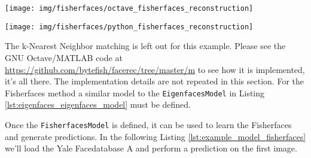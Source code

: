 \ifx\python\undefined
	\begin{center}
		\texttt{[image: img/fisherfaces/octave\_fisherfaces\_reconstruction]}
	\end{center}
\else
	\begin{center}
		\texttt{[image: img/fisherfaces/python\_fisherfaces\_reconstruction]}
	\end{center}
\fi

\ifx\python\undefined
	The k-Nearest Neighbor matching is left out for this example. Please see the GNU Octave/MATLAB code at \url{https://github.com/bytefish/facerec/tree/master/m} to see how it is implemented, it's all there.
\else
	The implementation details are not repeated in this section. For the Fisherfaces method a similar model to the \lstinline|EigenfacesModel| in Listing \ref{lst:eigenfaces_eigenfaces_model} must be defined.
		
	
	
		Once the \lstinline|FisherfacesModel| is defined, it can be used to learn the Fisherfaces and generate predictions. In the following Listing \ref{lst:example_model_fisherfaces} we'll load the Yale Facedatabase A and perform a prediction on the first image.
		
	

\fi
